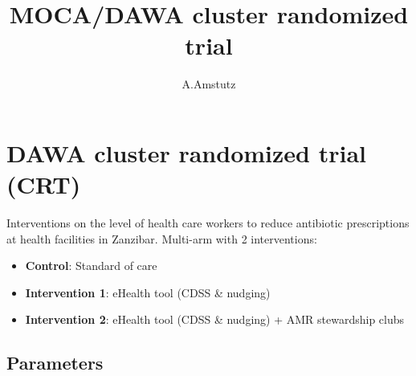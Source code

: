 \documentclass[
  letterpaper,
  DIV=11,
  numbers=noendperiod]{scrartcl}
\title{MOCA/DAWA cluster randomized trial}
\author{A.Amstutz}
\date{}
\renewcommand*\contentsname{Table of contents}
\newcommand\contentsname{Table of contents}
\begin{document}
\maketitle

\renewcommand*\contentsname{Table of contents}
{
\hypersetup{linkcolor=}
\setcounter{tocdepth}{3}
\tableofcontents
}

\section{DAWA cluster randomized trial
(CRT)}\label{dawa-cluster-randomized-trial-crt}

Interventions on the level of health care workers to reduce antibiotic
prescriptions at health facilities in Zanzibar. Multi-arm with 2
interventions:

\begin{itemize}
\item
  \textbf{Control}: Standard of care
\item
  \textbf{Intervention 1}: eHealth tool (CDSS \& nudging)
\item
  \textbf{Intervention 2}: eHealth tool (CDSS \& nudging) + AMR
  stewardship clubs
\end{itemize}

\subsection{Parameters}\label{parameters}
\end{document}
